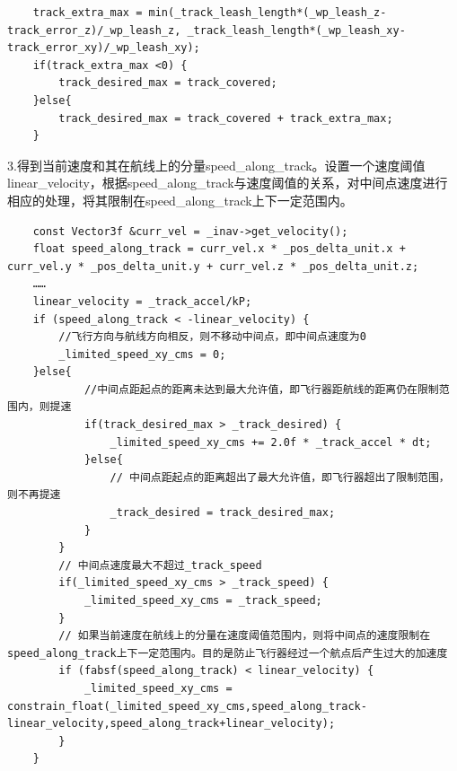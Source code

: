 \documentclass[a4paper,10pt]{ctexart} %
\begin{document}
\begin{lstlisting}
    track_extra_max = min(_track_leash_length*(_wp_leash_z-track_error_z)/_wp_leash_z, _track_leash_length*(_wp_leash_xy-track_error_xy)/_wp_leash_xy);
    if(track_extra_max <0) {
        track_desired_max = track_covered;
    }else{
        track_desired_max = track_covered + track_extra_max;
    }
\end{lstlisting}
3.得到当前速度和其在航线上的分量speed\_along\_track。设置一个速度阈值linear\_velocity，根据speed\_along\_track与速度阈值的关系，对中间点速度进行相应的处理，将其限制在speed\_along\_track上下一定范围内。
\begin{lstlisting}
    const Vector3f &curr_vel = _inav->get_velocity();
    float speed_along_track = curr_vel.x * _pos_delta_unit.x + curr_vel.y * _pos_delta_unit.y + curr_vel.z * _pos_delta_unit.z;
    ……
    linear_velocity = _track_accel/kP;
    if (speed_along_track < -linear_velocity) {
        //飞行方向与航线方向相反，则不移动中间点，即中间点速度为0
        _limited_speed_xy_cms = 0;
    }else{
    		//中间点距起点的距离未达到最大允许值，即飞行器距航线的距离仍在限制范围内，则提速
            if(track_desired_max > _track_desired) {
                _limited_speed_xy_cms += 2.0f * _track_accel * dt;
            }else{
                // 中间点距起点的距离超出了最大允许值，即飞行器超出了限制范围，则不再提速
                _track_desired = track_desired_max;
            }
        }
        // 中间点速度最大不超过_track_speed
        if(_limited_speed_xy_cms > _track_speed) {
            _limited_speed_xy_cms = _track_speed;
        }
        // 如果当前速度在航线上的分量在速度阈值范围内，则将中间点的速度限制在speed_along_track上下一定范围内。目的是防止飞行器经过一个航点后产生过大的加速度
        if (fabsf(speed_along_track) < linear_velocity) {
            _limited_speed_xy_cms = constrain_float(_limited_speed_xy_cms,speed_along_track-linear_velocity,speed_along_track+linear_velocity);
        }
    }
\end{lstlisting}
\end{document}
